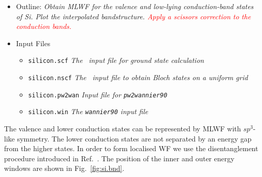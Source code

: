 \documentclass[a4paper,11pt,twoside]{article}
\def\tent#1{\textcolor{red}{#1}}     %
\begin{document}
\begin{itemize}
\item{Outline: \it{Obtain MLWF for the valence and low-lying
      conduction-band states of Si. Plot the interpolated
      bandstructure. \tent{Apply a scissors correction to the
        conduction bands.}}}
\item{Input Files}
\begin{itemize}
\item{ {\tt silicon.scf}  {\it The \pwscf\ input file for ground state
    calculation}} 
\item{ {\tt silicon.nscf}  {\it The \pwscf\ input file to obtain Bloch
    states on a uniform grid}} 
\item{ {\tt silicon.pw2wan}  {\it Input file for {\tt pw2wannier90}}}
\item{ {\tt silicon.win}  {\it The {\tt wannier90} input file}}
\end{itemize}
\end{itemize}
The valence and lower conduction states can be represented by MLWF
with $sp^3$-like symmetry. The lower conduction states are not 
separated by an energy gap from the higher states. In order to form
localised WF we use the disentanglement procedure
introduced in Ref.~\cite{SMV}. The position of the inner and outer
energy windows are shown in Fig.~\ref{fig:si.bnd}. 
\end{document}
